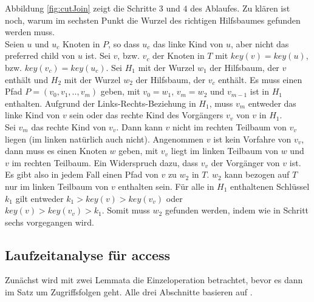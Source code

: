 \documentclass[a4paper,12pt]{article}
\begin{document}
Abbildung \ref{fig:cutJoin} zeigt die Schritte $3$ und $4$ des Ablaufes.
Zu klären ist noch, warum im sechsten Punkt die Wurzel des richtigen Hilfsbaumes gefunden werden muss.\\ Seien $u$ und $u_c$ Knoten in $P$, so dass $u_c$ das linke Kind von $u$, aber nicht das preferred child von $u$ ist. Sei $v$, bzw. $v_c$ der Knoten in $T$ mit $\mathit{key}\left(v\right) = \mathit{key}\left(u\right)$, bzw. $\mathit{key}\left(v_c\right) = \mathit{key}\left(u_c\right)$. Sei $H_1$ mit der Wurzel $w_1$ der Hilfsbaum, der $v$ enthält und $H_2$ mit der Wurzel $w_2$ der Hilfsbaum, der $v_c$ enthält. Es muss einen Pfad $P = \left(v_0, v_1,.., v_m \right)$ geben, mit $v_0 = w_1$, $v_m = w_2$ und $v_{m-1}$ ist in $H_1$ enthalten. Aufgrund der Links-Rechts-Beziehung in $H_1$, muss $v_m$ entweder das linke Kind von $v$ sein oder das rechte Kind des Vorgängers $v_v$ von $v$ in $H_1$. \\
Sei $v_m$ das rechte Kind von $v_v$. Dann kann $v$ nicht im rechten Teilbaum von $v_v$ liegen (im linken natürlich auch nicht). Angenommen $v$ ist kein Vorfahre von $v_v$, dann muss es einen Knoten $w$ geben, mit $v_v$ liegt im linken Teilbaum von $w$ und $v$ im rechten Teilbaum. Ein Widerspruch dazu, dass $v_v$ der Vorgänger von $v$ ist.\\
Es gibt also in jedem Fall einen Pfad von $v$ zu $w_2$ in $T$. $w_2$ kann bezogen auf $T$ nur im linken Teilbaum von $v$ enthalten sein. Für alle in $H_1$ enthaltenen Schlüssel $k_1$ gilt entweder $k_1 > \mathit{key}\left(v\right) > \mathit{key}\left(v_v\right) $ oder \\ $ \mathit{key}\left(v\right) > \mathit{key}\left(v_v\right) > k_1 $. Somit muss $w_2$ gefunden werden, indem wie in Schritt sechs vorgegangen wird. 


\subsection{Laufzeitanalyse für access}
Zunächst wird mit zwei Lemmata die Einzeloperation betrachtet, bevor es dann im Satz um Zugriffsfolgen geht. Alle drei Abschnitte basieren auf \cite{demainDinamicOpti}.
\end{document}
